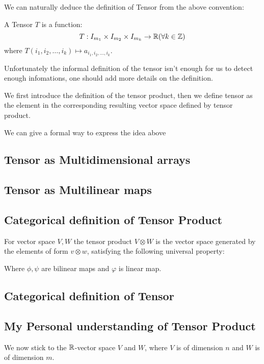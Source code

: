 \documentclass[11pt]{article}
\begin{document}
We can naturally deduce the definition of Tensor from the above convention:

\begin{definition}
A Tensor \(T\) is a function:
\[
T : I_{m_1} \times I_{m_2} \times I_{m_k} \to \mathbb{R} (\forall k \in \mathbb{Z})
\]
where \(T(i_1, i_2, \dots, i_k) \mapsto a_{i_1, i_2, \dots, i_k}\).
\end{definition}

Unfortunately the informal definition of the tensor isn't enough for us to detect enough infomations, one should add more details on the definition.

We first introduce the definition of the tensor product, then we define tensor as the element in the corresponding resulting vector space defined by tensor product.

We can give a formal way to express the idea above
\subsection{Tensor as Multidimensional arrays}
\label{sec:org447c717}
\subsection{Tensor as Multilinear maps}
\label{sec:orgfdaf60d}
\subsection{Categorical definition of Tensor Product}
\label{sec:orgfc8b6aa}
For vector space \(V, W\) the tensor product \(V \otimes W\) is the vector space generated by the elements of form \(v \otimes w\), satisfying the following universal property:
\begin{center}\end{center}

Where \(\phi,\psi\) are bilinear maps and \(\varphi\) is linear map.
\subsection{Categorical definition of Tensor}
\label{sec:orge69256a}
\subsection{My Personal understanding of Tensor Product}
\label{sec:org47e2abf}
We now stick to the \(\mathbb{R}\)-vector space \(V\) and \(W\), where \(V\) is of dimension \(n\) and \(W\) is of dimension \(m\).
\end{document}
